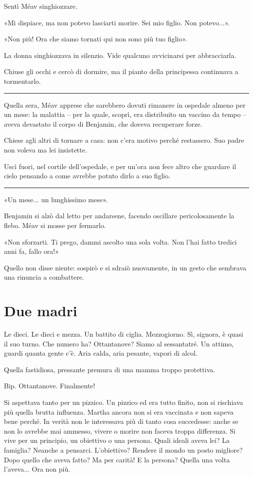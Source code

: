 \documentclass[a4paper,10pt]{memoir}
\begin{document}
Sentì Méav singhiozzare.

«Mi dispiace, ma non potevo lasciarti morire. Sei mio figlio. Non potevo...».

«Non più! Ora che siamo tornati qui non sono più tuo figlio».

La donna singhiozzava in silenzio. Vide qualcuno avvicinarsi per abbracciarla.

Chiuse gli occhi e cercò di dormire, ma il pianto della principessa continuava a tormentarlo.

\plainbreak{1}

Quella sera, Méav apprese che sarebbero dovuti rimanere in ospedale almeno per un mese: la malattia -- per la quale,
scoprì, era distribuito un vaccino da tempo -- aveva devastato il corpo di Benjamin, che doveva recuperare forze.

Chiese agli altri di tornare a casa: non c'era motivo perché restassero. Suo padre non voleva ma lei insistette.

Uscì fuori, nel cortile dell'ospedale, e per un'ora non fece altro che guardare il cielo pensando a come avrebbe potuto
dirlo a suo figlio.

\plainbreak{1}

«Un mese... un lunghissimo mese».

Benjamin si alzò dal letto per andarsene, facendo oscillare pericolosamente la flebo. Méav si mosse per fermarlo.

«Non sforzarti. Ti prego, dammi ascolto una sola volta. Non l’hai fatto tredici anni fa, fallo ora!»

Quello non disse niente: sospirò e si sdraiò nuovamente, in un gesto che sembrava una rinuncia a combattere.

\chapter{Due madri}

Le dieci. Le dieci e mezza. Un battito di ciglia. Mezzogiorno. Sì, signora, è quasi il suo turno. Che numero ha?
Ottantanove? Siamo al sessantatré. Un attimo, guardi quanta gente c’è. Aria calda, aria pesante, vapori di alcol.

Quella fastidiosa, pressante premura di una mamma troppo protettiva.

Bip. Ottantanove. Finalmente!

Si aspettava tanto per un pizzico. Un pizzico ed era tutto finito, non si rischiava più quella brutta influenza. Martha
ancora non si era vaccinata e non sapeva bene perché. In verità non le interessava più di tanto cosa succedesse: anche
se non lo avrebbe mai ammesso, vivere o morire non faceva troppa differenza. Si vive per un principio, un obiettivo o
una persona. Quali ideali aveva lei? La famiglia? Neanche a pensarci. L’obiettivo? Rendere il mondo un posto migliore?
Dopo quello che aveva fatto? Ma per carità! E la persona? Quella una volta l’aveva... Ora non più.
\end{document}
